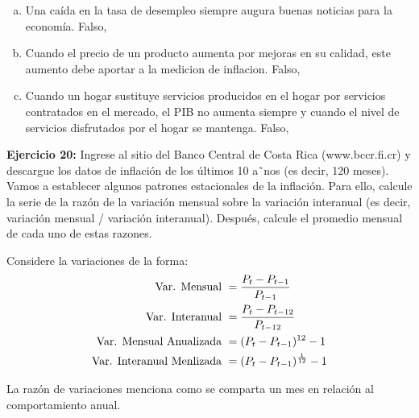 \begin{enumerate}[(a)]
    \item Una caída en la tasa de desempleo siempre augura buenas noticias para la economía. 
    Falso,
    
    \item Cuando el precio de un producto aumenta por mejoras en su calidad, este aumento
    debe aportar a la medicion de inflacion.
    Falso,
    
    \item Cuando un hogar sustituye servicios producidos en el hogar por servicios contratados en el mercado, el PIB no aumenta siempre y cuando el nivel de servicios disfrutados por el hogar se mantenga.
    Falso, 
\end{enumerate}

\textbf{Ejercicio 20: }Ingrese al sitio del Banco Central de Costa Rica (www.bccr.fi.cr) y descargue los datos de inflación de los últimos 10 a˜nos (es decir, 120 meses). Vamos a establecer algunos patrones estacionales de la inflación. Para ello, calcule la serie de la razón de la variación mensual sobre la variación interanual (es decir, variación mensual / variación interanual). Después, calcule el promedio mensual de cada uno de estas razones.

Considere la variaciones de la forma: 
\begin{align}
    \textup{Var. Mensual }&= \frac{P_{t}-P_{t-1}}{P_{t-1}}\\
    \textup{Var. Interanual }&= \frac{P_{t}-P_{t-12}}{P_{t-12}}\\
    \textup{Var. Mensual Anualizada }&= (P_{t}-P_{t-1})^{12}-1\\
    \textup{Var. Interanual Menlizada }&= (P_{t}-P_{t-1})^{\frac{1}{12}}-1
\end{align}

La razón de variaciones menciona como se comparta un mes en relación al comportamiento anual. 

